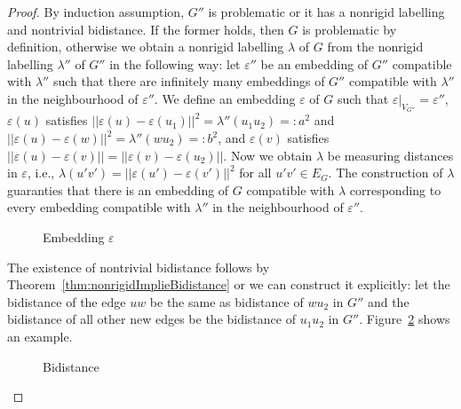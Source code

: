 \documentclass[a4paper, 11pt]{article}
\newcommand{\RR}{\mathbb{R}}
\theoremstyle{definition}
\begin{document}
\begin{proof}
By induction assumption, $G''$ is problematic or it has a nonrigid labelling and nontrivial bidistance. If the former holds, then $G$ is problematic by definition, otherwise we obtain a nonrigid labelling $\lambda$ of $G$ from the nonrigid labelling $\lambda''$ of $G''$ in the following way: let $\varepsilon''$ be an embedding of $G''$ compatible with $\lambda''$ such that there are infinitely many embeddings of $G''$ compatible with $\lambda''$ in the neighbourhood of $\varepsilon''$. We define an embedding $\varepsilon$ of $G$ such that $\varepsilon|_{V_{G''}}=\varepsilon''$, $\varepsilon(u)$ satisfies $||\varepsilon(u)-\varepsilon(u_1)||^2=\lambda''(u_1u_2)=:a^2$ and $||\varepsilon(u)-\varepsilon(w)||^2=\lambda''(wu_2)=:b^2$, and $\varepsilon(v)$ satisfies $||\varepsilon(u)-\varepsilon(v)|| =||\varepsilon(v)-\varepsilon(u_2)||$. Now we obtain $\lambda$ be measuring distances in $\varepsilon$, i.e., $\lambda(u'v')=||\varepsilon(u')-\varepsilon(v')||^2$ for all $u'v'\in E_G$. The construction of $\lambda$ guaranties that there is an embedding of $G$ compatible with $\lambda$ corresponding to every embedding compatible with $\lambda''$ in the neighbourhood of $\varepsilon''$.
\begin{figure}[htb!]
\centering

\caption{Embedding $\varepsilon$}
\label{fig:IIbembedding}
\end{figure}
The existence of nontrivial bidistance follows by Theorem~\ref{thm:nonrigidImplieBidistance} or we can construct it explicitly: let the bidistance of the edge $uw$ be the same as bidistance of $wu_2$ in $G''$ and the bidistance of all other new edges be the bidistance of $u_1u_2$ in $G''$. Figure~\ref{fig:IIbbidist} shows an example.
\begin{figure}[htb!]
\centering

\caption{Bidistance}
\label{fig:IIbbidist}
\end{figure}



\end{proof}
\end{document}
